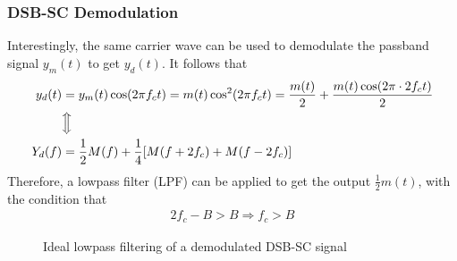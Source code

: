 \documentclass{report}
\begin{document}
\subsubsection{DSB-SC Demodulation}
Interestingly, the same carrier wave can be used to demodulate the passband signal $y_m(t)$ to get $y_d(t)$. It follows that 
\begin{align}
    y_d(t) &= y_m(t)\cos(2\pi f_c t) = m(t)\cos^2(2\pi f_c t) = \frac{m(t)}{2} + \frac{m(t)\cos(2\pi\cdot 2f_c t)}{2} \\
    &\Big\Updownarrow \nonumber \\
    Y_d(f) &= \frac{1}{2}M(f) + \frac{1}{4}[M(f+2f_c) + M(f-2f_c)]
\end{align}
Therefore, a lowpass filter (LPF) can be applied to get the output $\frac{1}{2}m(t)$, with the condition that 
\begin{align}
    2f_c - B > B \Longrightarrow f_c > B
\end{align}
\begin{figure}[!hbt]
    \centering
    \caption{Ideal lowpass filtering of a demodulated DSB-SC signal}
\end{figure}
\end{document}
